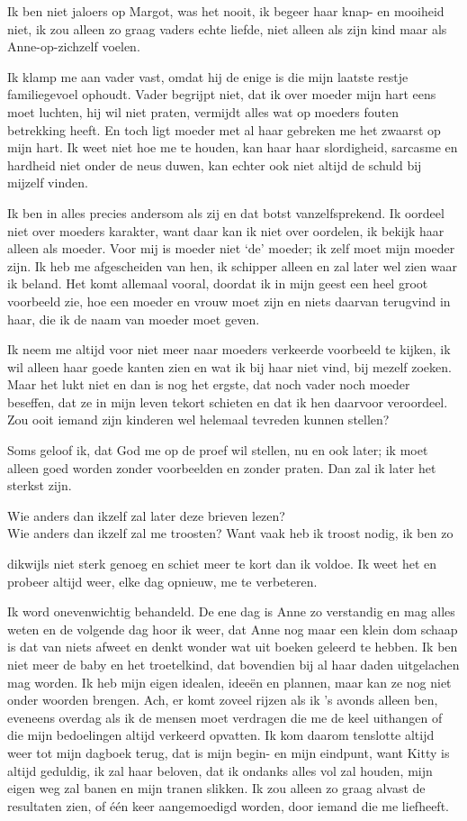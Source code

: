 \documentclass{book}
\begin{document}
Ik ben niet jaloers op Margot, was het nooit, ik begeer haar knap- en
mooiheid niet, ik zou alleen zo graag vaders echte liefde, niet alleen
als zijn kind maar als Anne-op-zichzelf voelen.

Ik klamp me aan vader vast, omdat hij de enige is die mijn laatste
restje familiegevoel ophoudt. Vader begrijpt niet, dat ik over moeder
mijn hart eens moet luchten, hij wil niet praten, vermijdt alles wat op
moeders fouten betrekking heeft. En toch ligt moeder met al haar
gebreken me het zwaarst op mijn hart. Ik weet niet hoe me te houden, kan
haar haar slordigheid, sarcasme en hardheid niet onder de neus duwen,
kan echter ook niet altijd de schuld bij mijzelf vinden.

Ik ben in alles precies andersom als zij en dat botst vanzelfsprekend.
Ik oordeel niet over moeders karakter, want daar kan ik niet over
oordelen, ik bekijk haar alleen als moeder. Voor mij is moeder niet `de'
moeder; ik zelf moet mijn moeder zijn. Ik heb me afgescheiden van hen,
ik schipper alleen en zal later wel zien waar ik beland. Het komt
allemaal vooral, doordat ik in mijn geest een heel groot voorbeeld zie,
hoe een moeder en vrouw moet zijn en niets daarvan terugvind in haar,
die ik de naam van moeder moet geven.

Ik neem me altijd voor niet meer naar moeders verkeerde voorbeeld te
kijken, ik wil alleen haar goede kanten zien en wat ik bij haar niet
vind, bij mezelf zoeken. Maar het lukt niet en dan is nog het ergste,
dat noch vader noch moeder beseffen, dat ze in mijn leven tekort
schieten en dat ik hen daarvoor veroordeel. Zou ooit iemand zijn
kinderen wel helemaal tevreden kunnen stellen?

Soms geloof ik, dat God me op de proef wil stellen, nu en ook later; ik
moet alleen goed worden zonder voorbeelden en zonder praten. Dan zal ik
later het sterkst zijn.

Wie anders dan ikzelf zal later deze brieven lezen?\\Wie anders dan
ikzelf zal me troosten? Want vaak heb ik troost nodig, ik ben zo

dikwijls niet sterk genoeg en schiet meer te kort dan ik voldoe. Ik weet
het en probeer altijd weer, elke dag opnieuw, me te verbeteren.

Ik word onevenwichtig behandeld. De ene dag is Anne zo verstandig en mag
alles weten en de volgende dag hoor ik weer, dat Anne nog maar een klein
dom schaap is dat van niets afweet en denkt wonder wat uit boeken
geleerd te hebben. Ik ben niet meer de baby en het troetelkind, dat
bovendien bij al haar daden uitgelachen mag worden. Ik heb mijn eigen
idealen, ideeën en plannen, maar kan ze nog niet onder woorden brengen.
Ach, er komt zoveel rijzen als ik 's avonds alleen ben, eveneens overdag
als ik de mensen moet verdragen die me de keel uithangen of die mijn
bedoelingen altijd verkeerd opvatten. Ik kom daarom tenslotte altijd
weer tot mijn dagboek terug, dat is mijn begin- en mijn eindpunt, want
Kitty is altijd geduldig, ik zal haar beloven, dat ik ondanks alles vol
zal houden, mijn eigen weg zal banen en mijn tranen slikken. Ik zou
alleen zo graag alvast de resultaten zien, of één keer aangemoedigd
worden, door iemand die me liefheeft.
\end{document}
